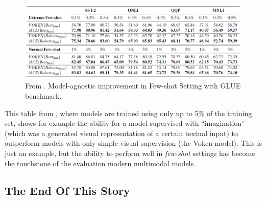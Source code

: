 \documentclass[
]{krantz}
\begin{document}
\begin{figure}

{\centering \includegraphics[width=1\linewidth]{figures/02-03-img-support-text/img-lu2022-02} 

}

\caption{From \citet{lu2022imagination}. Model-agnostic improvement in Few-shot Setting with GLUE benchmark.}\label{fig:img-lu2022-02}
\end{figure}



This table from \citet{lu2022imagination}, where models are trained using only up to 5\% of the training set, shows for example the ability for a model supervised with ``imagination'' (which was a generated visual representation of a certain textual input) to outperform models with only simple visual supervision (the Voken-model). This is just an example, but the ability to perform well in \emph{few-shot} settings has become the touchstone of the evaluation modern multimodal models.

\hypertarget{the-end-of-this-story}{%
\subsection{The End Of This Story}\label{the-end-of-this-story}}
\end{document}
